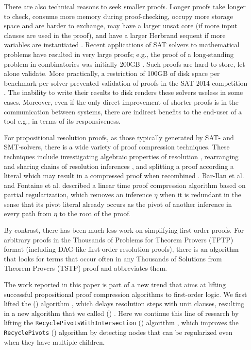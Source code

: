 There are also technical reasons to seek smaller proofs.
Longer proofs take longer to check, consume more memory during proof-checking, occupy more storage space and are harder to exchange, may have a larger unsat core (if more input clauses are used in the proof), and have a larger Herbrand sequent if more variables are instantiated \cite{B10,B16,ResolutionHerbrand,Reis}. Recent applications of SAT solvers to mathematical problems have resulted in very large proofs; e.g., the proof of a long-standing problem in combinatorics was initially 200GB \cite{heule2016solving}. Such proofs are hard to store, let alone validate. More practically, a restriction of 100GB of disk space per benchmark per solver prevented validation of proofs in the SAT 2014 competition \cite{clausal}. 
The inability to write their results to disk renders these solvers useless in some cases. Moreover, even if the only direct improvement of shorter proofs is in the communication between systems, there are indirect benefits to the end-user of a tool e.g., in terms of its responsiveness. 



For propositional resolution proofs, as those typically generated by SAT- and SMT-solvers, there is a wide variety of proof compression techniques. 
These techniques include investigating algebraic properties of resolution \cite{bwp10}, rearranging and sharing chains of resolution inferences \cite{Amjad07, Sinz}, and splitting a proof according a literal which may result in a compressed proof when recombined \cite{CottonSplit}.
Bar-Ilan et al. \cite{RP08} and Fontaine et al. \cite{LURPI} described a linear time proof compression algorithm based on partial
regularization, which removes an inference $\eta$ when it is redundant in the sense that its pivot literal already occurs as the pivot of another inference in every path from $\eta$ to the root of the proof.



By contrast, there has been much less work on simplifying first-order proofs. 
For arbitrary proofs in the Thousands of Problems for Theorem Provers (TPTP) \cite{TPTP} format (including DAG-like first-order resolution proofs), there is an algorithm \cite{LPARCzech} that looks for terms that occur often in any Thousands of Solutions from Theorem Provers (TSTP) \cite{TPTP} proof and abbreviates them. 


The work reported in this paper is part of a new trend that aims at lifting successful propositional proof compression algorithms to first-order logic. 
We first lifted the {\LowerUnits} ({\LU}) algorithm \cite{LURPI}, which delays resolution steps with unit clauses, resulting in a new algorithm that we called
{\SFOLowerUnits} 
({\GFOLU}) \cite{GFOLU}. Here we continue this line of research by lifting the 
\texttt{Recycle\-PivotsWithIntersection}
({\RPI}) algorithm \cite{LURPI}, which improves the \texttt{RecyclePivots} ({\RP}) algorithm \cite{RP08} by detecting nodes that can be regularized even when they have multiple children. 


